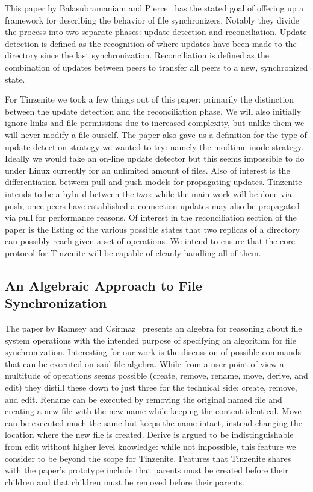 This paper by Balasubramaniam and Pierce~\cite{balasubramaniam1998file} has the stated goal of offering up a framework for describing the behavior of file synchronizers.
Notably they divide the process into two separate phases: update detection and reconciliation.
Update detection is defined as the recognition of where updates have been made to the directory since the last synchronization.
Reconciliation is defined as the combination of updates between peers to transfer all peers to a new, synchronized state.

For Tinzenite we took a few things out of this paper: primarily the distinction between the update detection and the reconciliation phase.
We will also initially ignore links and file permissions due to increased complexity, but unlike them we will never modify a file ourself.
The paper also gave us a definition for the type of update detection strategy we wanted to try: namely the modtime inode strategy.
Ideally we would take an on-line update detector but this seems impossible to do under Linux currently for an unlimited amount of files.
Also of interest is the differentiation between pull and push models for propagating updates.
Tinzenite intends to be a hybrid between the two: while the main work will be done via push, once peers have established a connection updates may also be propagated via pull for performance reasons.
Of interest in the reconciliation section of the paper is the listing of the various possible states that two replicas of a directory can possibly reach given a set of operations.
We intend to ensure that the core protocol for Tinzenite will be capable of cleanly handling all of them.

\subsection{An Algebraic Approach to File Synchronization}
\label{sub:An Algebraic Approach to File Synchronization}

The paper by Ramsey and Csirmaz~\cite{ramsey2001algebraic} presents an algebra for reasoning about file system operations with the intended purpose of specifying an algorithm for file synchronization.
Interesting for our work is the discussion of possible commands that can be executed on said file algebra.
While from a user point of view a multitude of operations seems possible (create, remove, rename, move, derive, and edit) they distill these down to just three for the technical side: create, remove, and edit.
Rename can be executed by removing the original named file and creating a new file with the new name while keeping the content identical.
Move can be executed much the same but keeps the name intact, instead changing the location where the new file is created.
Derive is argued to be indistinguishable from edit without higher level knowledge: while not impossible, this feature we consider to be beyond the scope for Tinzenite.
Features that Tinzenite shares with the paper's prototype include that parents must be created before their children and that children must be removed before their parents.

